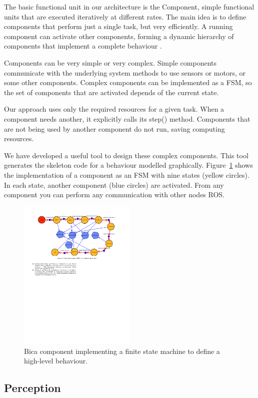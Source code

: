 \documentclass[conference]{IEEEtran}
\begin{document}
The basic functional unit in our architecture is the Component, simple functional units
that are executed iteratively at different rates. The main idea is to define components that
perform just a single task, but very efficiently. A running component can activate other
components, forming a dynamic hierarchy of components that implement a complete
behaviour .

Components can be very simple or very complex. Simple components communicate with
the underlying system methods to use sensors or motors, or some other components.
Complex components can be implemented as a FSM, so the set of components that are
activated depends of the current state.


Our approach uses only the required resources for a given task. When a component needs
another, it explicitly calls its step() method. Components that are not being used by
another component do not run, saving computing resources. 

We have developed a useful tool to design these complex components. This tool generates
the skeleton code for a behaviour  modelled graphically. Figure~\ref{fig:Bicacomponent} shows the implementation
of a component as an FSM with nine states (yellow circles). In each state, another component
(blue circles) are activated. From any component you can perform any communication with
other nodes ROS.


\begin{figure}[ht]
  \centering
  \includegraphics[width=0.5\textwidth]{202}
  \caption{Bica component implementing a finite state machine to define a high-level behaviour.} 
  \label{fig:Bicacomponent}
\end{figure}


\subsection{Perception}
\end{document}
